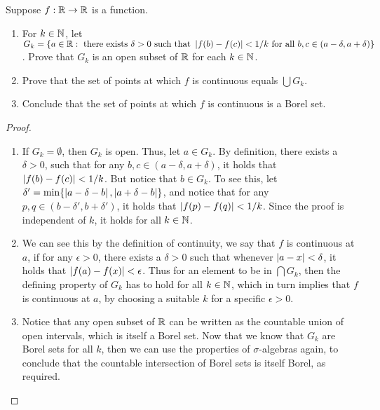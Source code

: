 \begin{exercise}{12}
Suppose $f : \mathbb{R} \to \mathbb{R}$ is a function.
\begin{enumerate}
    \item For $k \in \mathbb{N}$, let $G_k = \{a\in\mathbb{R} : \text{ there exists } \delta >0 \text{ such that } \left\lvert f(b)-f(c)\right\rvert<1/k \text{ for all } b,c\in(a-\delta,a+\delta)\}$.
    Prove that $G_k$ is an open subset of $\mathbb{R}$ for each $k\in\mathbb{N}$.
    \item Prove that the set of points at which $f$ is continuous equals $\bigcup G_k$.
    \item Conclude that the set of points at which $f$ is continuous is a Borel set.
\end{enumerate}
\end{exercise}
\begin{proof}
\begin{enumerate}
    \item If $G_k=\emptyset$, then $G_k$ is open.
    Thus, let $a \in G_k$.
    By definition, there exists a $\delta>0$, such that for any $b,c\in (a-\delta, a+\delta)$, it holds that $\left\lvert f(b)-f(c)\right\rvert < 1/k$. 
    But notice that $b \in G_k$.
    To see this, let $\delta' = \min\{\left\lvert a-\delta-b\right\rvert, \left\lvert a+\delta-b\right\rvert\}$, and notice that for any $p,q \in (b-\delta', b+\delta')$, it holds that $\left\lvert f(p)-f(q)\right\rvert < 1/k$.
    Since the proof is independent of $k$, it holds for all $k \in \mathbb{N}$.
    \item We can see this by the definition of continuity, we say that $f$ is continuous at $a$, if for any $\epsilon>0$, there exists a $\delta>0$ such that whenever $\left\lvert a-x\right\rvert<\delta$, it holds that $\left\lvert f(a)-f(x)\right\rvert<\epsilon$.
    Thus for an element to be in $\bigcap G_k$, then the defining property of $G_k$ has to hold for all $k\in\mathbb{N}$, which in turn implies that $f$ is continuous at $a$, by choosing a suitable $k$ for a specific $\epsilon>0$.
    \item Notice that any open subset of $\mathbb{R}$ can be written as the countable union of open intervals, which is itself a Borel set.
    Now that we know that $G_k$ are Borel sets for all $k$, then we can use the properties of $\sigma$-algebras again, to conclude that the countable intersection of Borel sets is itself Borel, as required.
\end{enumerate}
\end{proof} 

